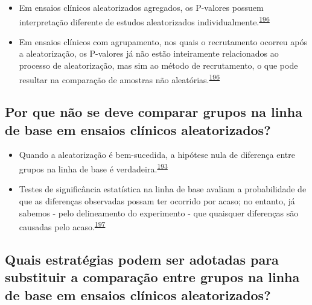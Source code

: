 \documentclass[
  a4paper,
]{book}
\begin{document}
\begin{itemize}
\item
  Em ensaios clínicos aleatorizados agregados, os P-valores possuem interpretação diferente de estudos aleatorizados individualmente.\textsuperscript{\protect\hyperlink{ref-Bolzern2019}{196}}
\item
  Em ensaios clínicos com agrupamento, nos quais o recrutamento ocorreu após a aleatorização, os P-valores já não estão inteiramente relacionados ao processo de aleatorização, mas sim ao método de recrutamento, o que pode resultar na comparação de amostras não aleatórias.\textsuperscript{\protect\hyperlink{ref-Bolzern2019}{196}}
\end{itemize}

\hypertarget{por-que-nuxe3o-se-deve-comparar-grupos-na-linha-de-base-em-ensaios-cluxednicos-aleatorizados}{%
\subsection{Por que não se deve comparar grupos na linha de base em ensaios clínicos aleatorizados?}\label{por-que-nuxe3o-se-deve-comparar-grupos-na-linha-de-base-em-ensaios-cluxednicos-aleatorizados}}

\begin{itemize}
\item
  Quando a aleatorização é bem-sucedida, a hipótese nula de diferença entre grupos na linha de base é verdadeira.\textsuperscript{\protect\hyperlink{ref-roberts1999}{193}}
\item
  Testes de significância estatística na linha de base avaliam a probabilidade de que as diferenças observadas possam ter ocorrido por acaso; no entanto, já sabemos - pelo delineamento do experimento - que quaisquer diferenças são causadas pelo acaso.\textsuperscript{\protect\hyperlink{ref-gruijters2020}{197}}
\end{itemize}

\hypertarget{quais-estratuxe9gias-podem-ser-adotadas-para-substituir-a-comparauxe7uxe3o-entre-grupos-na-linha-de-base-em-ensaios-cluxednicos-aleatorizados}{%
\subsection{Quais estratégias podem ser adotadas para substituir a comparação entre grupos na linha de base em ensaios clínicos aleatorizados?}\label{quais-estratuxe9gias-podem-ser-adotadas-para-substituir-a-comparauxe7uxe3o-entre-grupos-na-linha-de-base-em-ensaios-cluxednicos-aleatorizados}}
\end{document}
